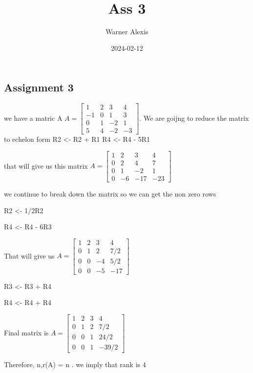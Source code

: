 \documentclass[
]{article}
\title{Ass 3}
\author{Warner Alexis}
\date{2024-02-12}
\begin{document}
\maketitle

\hypertarget{assignment-3}{%
\subsection{Assignment 3}\label{assignment-3}}

we have a matric A
\(A = \begin{bmatrix}1 & 2 & 3 & 4\\ -1 &0 & 1 & 3 \\ 0 & 1 & -2 & 1 \\ 5 & 4 & -2 & -3\end{bmatrix}\).
We are goijng to reduce the matrix to echelon form R2 \textless- R2 + R1
R4 \textless- R4 - 5R1

that will give us this matrix
\(A = \begin{bmatrix}1 & 2 & 3 & 4\\ 0 &2 & 4 & 7 \\ 0 & 1 & -2 & 1 \\ 0 & -6 & -17 & -23\end{bmatrix}\)

we continue to break down the matrix so we can get the non zero rows

R2 \textless- 1/2R2

R4 \textless- R4 - 6R3

That will give us
\(A = \begin{bmatrix}1 & 2 & 3 & 4\\ 0 &1 & 2 & 7/2 \\ 0 & 0 & -4 & 5/2 \\ 0 & 0 & -5 & -17\end{bmatrix}\)

R3 \textless- R3 + R4

R4 \textless- R4 + R4

Final matrix is
\(A = \begin{bmatrix}1 & 2 & 3 & 4\\ 0 &1 & 2 & 7/2 \\ 0 & 0 & 1 & 24/2 \\ 0 & 0 & 1 & -39/2\end{bmatrix}\)

Therefore, n,r(A) = n . we imply that rank is 4
\end{document}
